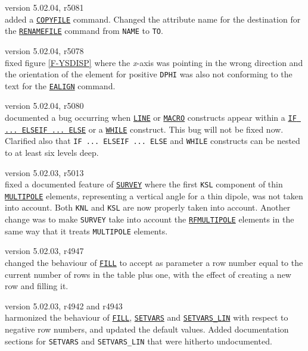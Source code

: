 \begin{madlist}
  
   version 5.02.04, r5081\\
  added a \hyperref[sec:copyfile]{\texttt{COPYFILE}} command. Changed the attribute 
  name for the destination for the \hyperref[sec:renamefile]{\texttt{RENAMEFILE}} 
  command from \texttt{NAME} to \texttt{TO}.
  
  
   version 5.02.04, r5078\\
  fixed figure \ref{F-YSDISP} where the \textit{x}-axis was pointing in
  the wrong direction and the orientation of the element for positive
  \texttt{DPHI} was also not conforming to the text for the
  \hyperref[sec:ealign]{\texttt{EALIGN}} command.
  
  
    version 5.02.04, r5080\\
  documented a bug occurring when \hyperref[sec:beamline]{\texttt{LINE}}
  or \hyperref[sec:macro]{\texttt{MACRO}} constructs appear within a
  \hyperref[sec:if]{\texttt{IF ... ELSEIF ... ELSE}} or a 
  \hyperref[sec:while]{\texttt{WHILE}} construct. This bug will not be
  fixed now. \\  
  Clarified also that \texttt{IF ... ELSEIF ... ELSE} and \texttt{WHILE}
  constructs can be nested to at least six levels deep.
  
  
   version 5.02.03, r5013\\
  fixed a documented feature of \hyperref[chap:survey]{\texttt{SURVEY}}
  where the first \texttt{KSL} component of thin
  \hyperref[sec:multipole]{\texttt{MULTIPOLE}} elements, representing a
  vertical angle for a thin dipole, was not taken into account. Both
  \texttt{KNL} and \texttt{KSL} are now properly taken into
  account. Another change was to make \texttt{SURVEY} take into account
  the \hyperref[sec:rfmultipole]{\texttt{RFMULTIPOLE}} elements in the
  same way that it treats \texttt{MULTIPOLE} elements.
  
  
   version 5.02.03, r4947 \\
  changed the behaviour of \hyperref[sec:fill]{\texttt{FILL}} to accept as
  parameter a row number equal to the current number of rows in the
  table plus one, with the effect of creating a new row and filling it. 
  
  
   version 5.02.03, r4942 and r4943\\
  harmonized the behaviour of \hyperref[sec:fill]{\texttt{FILL}},
  \hyperref[sec:setvars]{\texttt{SETVARS}} and
  \hyperref[sec:setvars-lin]{\texttt{SETVARS\_LIN}} with respect to
  negative row numbers, and updated the default values. Added
  documentation sections for \texttt{SETVARS} and \texttt{SETVARS\_LIN}
  that were hitherto undocumented.   
  

\end{madlist}
